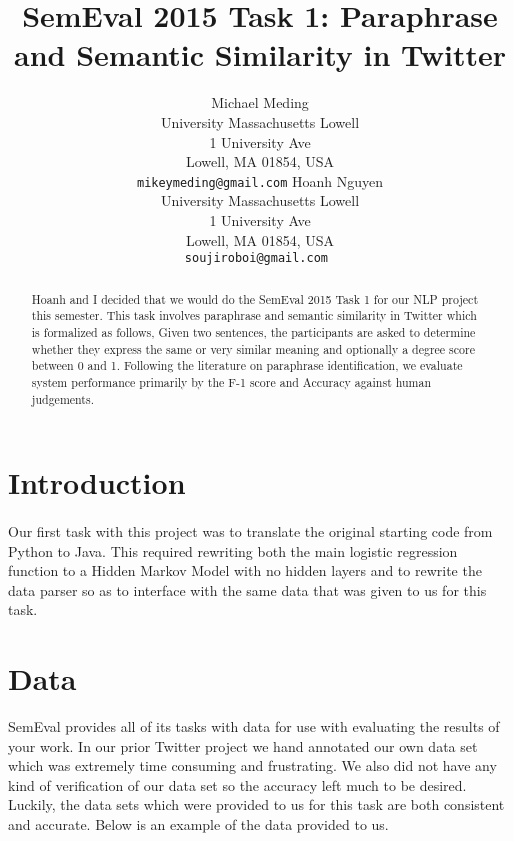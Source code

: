 \documentclass[11pt,letterpaper]{article}
\title{SemEval 2015 Task 1: Paraphrase and Semantic Similarity in Twitter}
\author{
	Michael Meding\\
  	University Massachusetts Lowell\\
	1 University Ave\\
	Lowell, MA 01854, USA\\
   {\tt mikeymeding@gmail.com}
	\And  
   Hoanh Nguyen\\
	University Massachusetts Lowell\\
	1 University Ave\\
	Lowell, MA 01854, USA\\
	{\tt soujiroboi@gmail.com }
}
\date{}
\begin{document}
\maketitle
\begin{abstract}
Hoanh and I decided that we would do the SemEval 2015 Task 1 for our NLP project this semester. This task involves paraphrase and semantic similarity in Twitter which is formalized as follows, Given two sentences, the participants are asked to determine whether they express the same or very similar meaning and optionally a degree score between 0 and 1. Following the literature on paraphrase identification, we evaluate system performance primarily by the F-1 score and Accuracy against human judgements. 
\end{abstract}

\section{Introduction}
\paragraph{} 
Our first task with this project was to translate the original starting code from Python to Java. This required rewriting both the main logistic regression function to a Hidden Markov Model with no hidden layers and to rewrite the data parser so as to interface with the same data that was given to us for this task.


\section{Data}
SemEval provides all of its tasks with data for use with evaluating the results of your work. In our prior Twitter project we hand annotated our own data set which was 
extremely time consuming and frustrating. We also did not have any kind of verification of our data set so the accuracy left much to be desired. Luckily, the data sets which were provided to us for this task are both consistent and accurate. Below is an example of the data provided to us.


\end{document}
